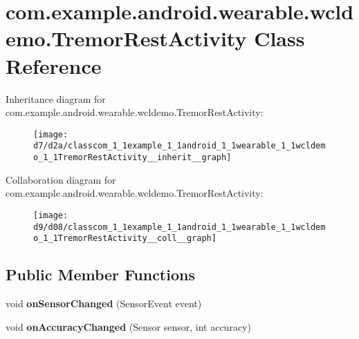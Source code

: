 \hypertarget{classcom_1_1example_1_1android_1_1wearable_1_1wcldemo_1_1TremorRestActivity}{}\section{com.\+example.\+android.\+wearable.\+wcldemo.\+Tremor\+Rest\+Activity Class Reference}
\label{classcom_1_1example_1_1android_1_1wearable_1_1wcldemo_1_1TremorRestActivity}


Inheritance diagram for com.\+example.\+android.\+wearable.\+wcldemo.\+Tremor\+Rest\+Activity\+:\nopagebreak
\begin{figure}[H]
\begin{center}
\leavevmode
\texttt{[image: d7/d2a/classcom\_1\_1example\_1\_1android\_1\_1wearable\_1\_1wcldemo\_1\_1TremorRestActivity\_\_inherit\_\_graph]}
\end{center}
\end{figure}


Collaboration diagram for com.\+example.\+android.\+wearable.\+wcldemo.\+Tremor\+Rest\+Activity\+:\nopagebreak
\begin{figure}[H]
\begin{center}
\leavevmode
\texttt{[image: d9/d08/classcom\_1\_1example\_1\_1android\_1\_1wearable\_1\_1wcldemo\_1\_1TremorRestActivity\_\_coll\_\_graph]}
\end{center}
\end{figure}
\subsection*{Public Member Functions}
\begin{DoxyCompactItemize}
\item 
void {\bfseries on\+Sensor\+Changed} (Sensor\+Event event)\hypertarget{classcom_1_1example_1_1android_1_1wearable_1_1wcldemo_1_1TremorRestActivity_ad5fc559308909e8abca3396b2fd74c42}{}\label{classcom_1_1example_1_1android_1_1wearable_1_1wcldemo_1_1TremorRestActivity_ad5fc559308909e8abca3396b2fd74c42}

\item 
void {\bfseries on\+Accuracy\+Changed} (Sensor sensor, int accuracy)\hypertarget{classcom_1_1example_1_1android_1_1wearable_1_1wcldemo_1_1TremorRestActivity_a48974265400b02f507d2e59400d606d7}{}\label{classcom_1_1example_1_1android_1_1wearable_1_1wcldemo_1_1TremorRestActivity_a48974265400b02f507d2e59400d606d7}

\end{DoxyCompactItemize}
